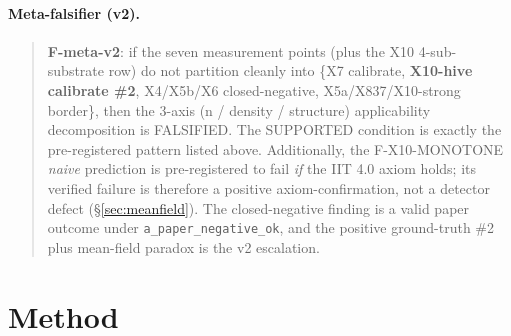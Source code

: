 \documentclass[11pt,a4paper]{article}
\begin{document}
\paragraph{Meta-falsifier (v2).}
\begin{quote}
\textbf{F-meta-v2}: if the seven measurement points (plus the X10
4-sub-substrate row) do not partition cleanly into
\{X7 calibrate, \textbf{X10-hive calibrate \#2},
X4/X5b/X6 closed-negative, X5a/X837/X10-strong border\}, then the
3-axis (n / density / structure) applicability decomposition is
FALSIFIED. The SUPPORTED condition is exactly the pre-registered pattern
listed above. Additionally, the F-X10-MONOTONE \emph{naive} prediction
is pre-registered to fail \emph{if} the IIT 4.0 axiom holds; its
verified failure is therefore a positive axiom-confirmation, not a
detector defect (\S\ref{sec:meanfield}). The closed-negative finding
is a valid paper outcome under \texttt{a\_paper\_negative\_ok}, and
the positive ground-truth \#2 plus mean-field paradox is the v2
escalation.
\end{quote}

\section{Method}
\label{sec:method}
\end{document}

